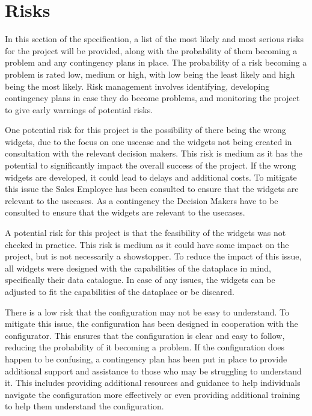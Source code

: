 \chapter{Risks}

In this section of the specification, a list of the most likely and most serious risks for the project will be provided, along with the probability of them becoming a problem and any contingency plans in place. The probability of a risk becoming a problem is rated low, medium or high, with low being the least likely and high being the most likely. Risk management involves identifying, developing contingency plans in case they do become problems, and monitoring the project to give early warnings of potential risks.

One potential risk for this project is the possibility of there being the wrong \glspl{widget}, due to the focus on one \gls{usecase} and the \glspl{widget} not being created in consultation with the relevant decision makers. This risk is medium as it has the potential to significantly impact the overall success of the project. If the wrong \glspl{widget} are developed, it could lead to delays and additional costs. To mitigate this issue the Sales Employee has been consulted to ensure that the \glspl{widget} are relevant to the \glspl{usecase}. As a contingency the Decision Makers have to be consulted to ensure that the \glspl{widget} are relevant to the \glspl{usecase}.

A potential risk for this project is that the feasibility of the \glspl{widget} was not checked in practice. This risk is medium as it could have some impact on the project, but is not necessarily a showstopper. To reduce the impact of this issue, all \glspl{widget} were designed with the capabilities of the \gls{dataplace} in mind, specifically their data catalogue. In case of any issues, the \glspl{widget} can be adjusted to fit the capabilities of the \gls{dataplace} or be discared.

There is a low risk that the configuration may not be easy to understand. To mitigate this issue, the configuration has been designed in cooperation with the configurator. This ensures that the configuration is clear and easy to follow, reducing the probability of it becoming a problem. If the configuration does happen to be confusing, a contingency plan has been put in place to provide additional support and assistance to those who may be struggling to understand it. This includes providing additional resources and guidance to help individuals navigate the configuration more effectively or even providing additional training to help them understand the configuration.

